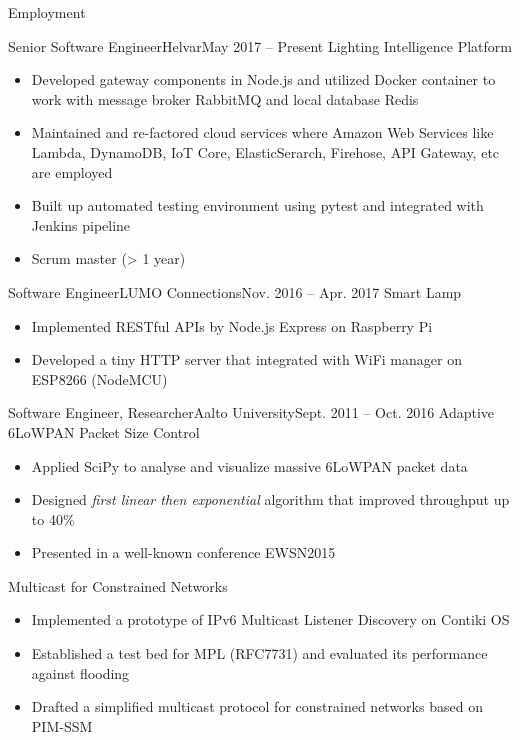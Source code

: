 \documentclass[print]{mcdowellcv}
\begin{document}
	\makeheader
	
	\begin{cvsection}{Employment}
		\begin{cvsubsection}{Senior Software Engineer}{Helvar}{May 2017 -- Present}
			Lighting Intelligence Platform
			\begin{itemize}
				\item Developed gateway components in Node.js and utilized Docker container to work with message broker RabbitMQ and local database Redis
				\item Maintained and re-factored cloud services where Amazon Web Services like Lambda, DynamoDB, IoT Core, ElasticSerarch, Firehose, API Gateway, etc are employed
				\item Built up automated testing environment using pytest and integrated with Jenkins pipeline
				\item Scrum master (> 1 year)
			\end{itemize}
		\end{cvsubsection}
		
		\begin{cvsubsection}{Software Engineer}{LUMO Connections}{Nov. 2016 -- Apr. 2017}
			Smart Lamp
			\begin{itemize}
				\item Implemented RESTful APIs by Node.js Express on Raspberry Pi
				\item Developed a tiny HTTP server that integrated with WiFi manager on ESP8266 (NodeMCU)
			\end{itemize}
		\end{cvsubsection}
			
		\begin{cvsubsection}{Software Engineer, Researcher}{Aalto University}{Sept. 2011 -- Oct. 2016}
			Adaptive 6LoWPAN Packet Size Control
			\begin{itemize}
				\item Applied SciPy to analyse and visualize massive 6LoWPAN packet data
				\item Designed \textit{first linear then exponential} algorithm that improved throughput up to 40\%
				\item Presented in a well-known conference EWSN2015
			\end{itemize}
			\smallskip
			Multicast for Constrained Networks
			\begin{itemize}
				\item Implemented a prototype of IPv6 Multicast Listener Discovery on Contiki OS
				\item Established a test bed for MPL (RFC7731) and evaluated its performance against flooding 
				\item Drafted a simplified multicast protocol for constrained networks based on PIM-SSM
			\end{itemize}
		\end{cvsubsection}


\end{cvsection}
\end{document}
